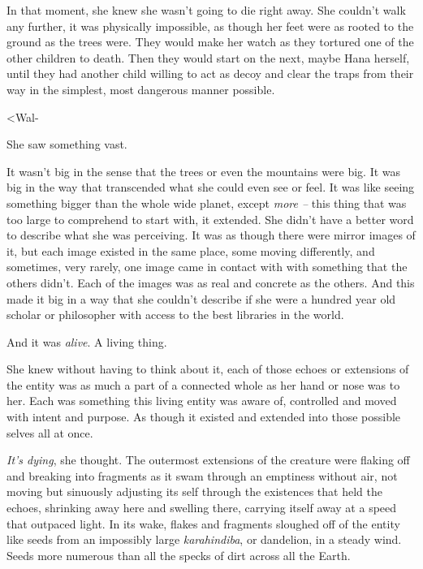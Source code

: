 In that moment, she knew she wasn't going to die right away.  She couldn't walk any further, it was physically impossible, as though her feet were as rooted to the ground as the trees were.  They would make her watch as they tortured one of the other children to death.  Then they would start on the next, maybe Hana herself, until they had another child willing to act as decoy and clear the traps from their way in the simplest, most dangerous manner possible.



<Wal-



She saw something vast.



It wasn't big in the sense that the trees or even the mountains were big.  It was big in the way that transcended what she could even see or feel.  It was like seeing something bigger than the whole wide planet, except \emph{more – }this\emph{ }thing that was too large to comprehend to start with, it extended.  She didn't have a better word to describe what she was perceiving.  It was as though there were mirror images of it, but each image existed in the same place, some moving differently, and sometimes, very rarely, one image came in contact with with something that the others didn't.  Each of the images was as real and concrete as the others.  And this made it big in a way that she couldn't describe if she were a hundred year old scholar or philosopher with access to the best libraries in the world.



And it was \emph{alive}.  A living thing.



She knew without having to think about it, each of those echoes or extensions of the entity was as much a part of a connected whole as her hand or nose was to her.  Each was something this living entity was aware of, controlled and moved with intent and purpose.  As though it existed and extended into those possible selves all at once.



\emph{It's dying}, she thought.  The outermost extensions of the creature were flaking off and breaking into fragments as it swam through an emptiness without air, not moving but sinuously adjusting its self through the existences that held the echoes, shrinking away here and swelling there, carrying itself away at a speed that outpaced light.  In its wake, flakes and fragments sloughed off of the entity like seeds from an impossibly large \emph{karahindiba}, or dandelion, in a steady wind.  Seeds more numerous than all the specks of dirt across all the Earth.



